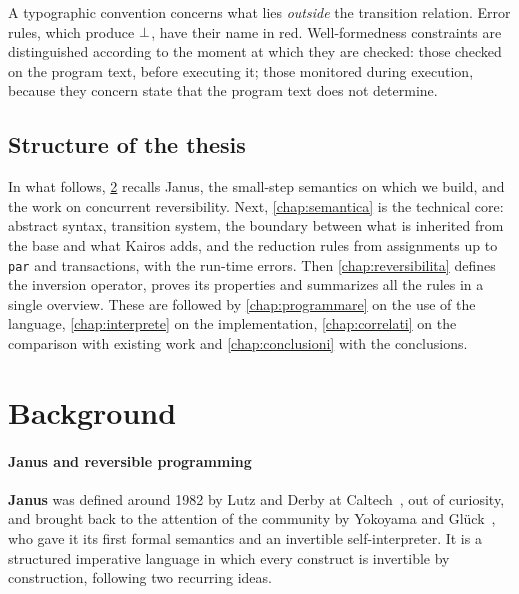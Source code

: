 A typographic convention concerns what lies \emph{outside} the transition
relation. Error rules, which produce $\bot$, have their name in
\textcolor{red!60!black}{red}. Well-formedness constraints are distinguished
according to the moment at which they are checked:  those checked
on the program text, before executing it;  those
monitored during execution, because they concern state that the program text
does not determine.

\section{Structure of the thesis}

In what follows, \cref{chap:background} recalls Janus, the small-step semantics on which we
build, and the work on concurrent reversibility. Next, \cref{chap:semantica} is
the technical core: abstract syntax, transition system, the boundary between what
is inherited from the base and what Kairos adds, and the reduction rules
from assignments up to \texttt{par} and transactions, with the run-time
errors. Then \cref{chap:reversibilita} defines the inversion operator, proves its
properties and summarizes all the rules in a single overview. These are followed by
\cref{chap:programmare} on the use of the language, \cref{chap:interprete}
on the implementation, \cref{chap:correlati} on the comparison with existing
work and \cref{chap:conclusioni} with the conclusions.

\chapter{Background}
\label{chap:background}
\label{sec:back}

\subsubsection{Janus and reversible programming}

\textbf{Janus} was defined around 1982 by Lutz and Derby at
Caltech~\cite{LutzDerby1982}, out of curiosity, and brought back to the attention of the community by Yokoyama and
Glück~\cite{YokoyamaGluck2007}, who gave it its first formal semantics and
an invertible self-interpreter. It is a structured imperative language in which
every construct is invertible by construction, following two recurring ideas.

